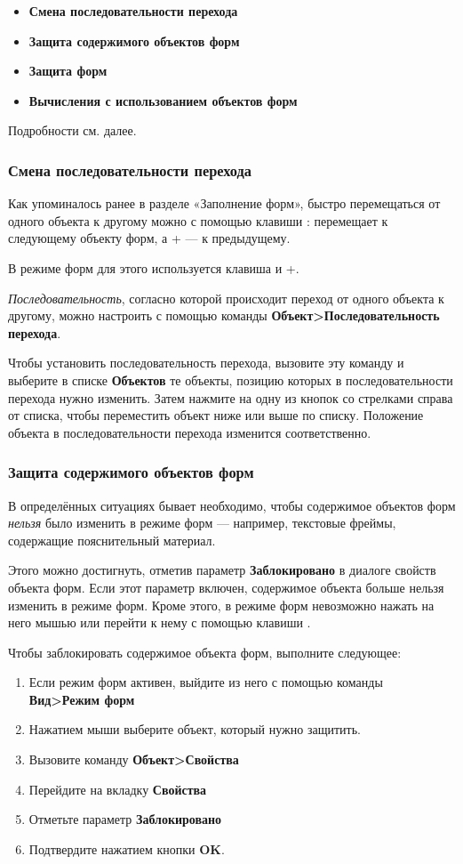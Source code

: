 ﻿\documentclass[a4paper,10pt]{article}
\begin{document}
\begin{itemize}
 \item \textbf{Смена последовательности перехода}
 \item \textbf{Защита содержимого объектов форм}
 \item \textbf{Защита форм}
 \item \textbf{Вычисления с использованием объектов форм}
\end{itemize}

Подробности см. далее.

\subsubsection{Смена последовательности перехода}
Как упоминалось ранее в разделе «Заполнение форм», быстро перемещаться от одного объекта к другому можно с помощью клавиши :  перемещает к следующему объекту форм, а + — к предыдущему.

В режиме форм для этого используется клавиша  и +.

\textit{Последовательность}, согласно которой происходит переход от одного объекта к другому, можно настроить с помощью команды \textbf{Объект>Последовательность перехода}.

Чтобы установить последовательность перехода, вызовите эту команду и выберите в списке \textbf{Объектов} те объекты, позицию которых в последовательности перехода нужно изменить. Затем нажмите на одну из кнопок со стрелками справа от списка, чтобы переместить объект ниже или выше по списку. Положение объекта в последовательности перехода изменится соответственно.

\subsubsection{Защита содержимого объектов форм} \label{sec:защитасодержобъектовформ}
В определённых ситуациях бывает необходимо, чтобы содержимое объектов форм \textit{нельзя} было изменить в режиме форм — например, текстовые фреймы, содержащие пояснительный материал.

Этого можно достигнуть, отметив параметр \textbf{Заблокировано} в диалоге свойств объекта форм. Если этот параметр включен, содержимое объекта больше нельзя изменить в режиме форм. Кроме этого, в режиме форм невозможно нажать на него мышью или перейти к нему с помощью клавиши .

Чтобы заблокировать содержимое объекта форм, выполните следующее:
\begin{enumerate}
 \item Если режим форм активен, выйдите из него с помощью команды \textbf{Вид>Режим форм}
 \item Нажатием мыши выберите объект, который нужно защитить.
 \item Вызовите команду \textbf{Объект>Свойства}
 \item Перейдите на вкладку \textbf{Свойства}
 \item Отметьте параметр \textbf{Заблокировано}
 \item Подтвердите нажатием кнопки \textbf{OK}.
\end{enumerate}
\end{document}
